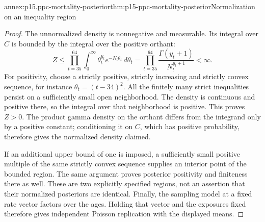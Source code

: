 \begin{annexitem}{annex:p15.ppc-mortality-posterior}{thm:p15-ppc-mortality-posterior}{Normalization on an inequality region}
\begin{proof}
The unnormalized density is nonnegative and measurable. Its integral over
\(C\) is bounded by the integral over the positive orthant:
\[
 Z\leq\prod_{t=35}^{64}\int_0^\infty
               \theta_t^{y_t}e^{-N_t\theta_t}\,d\theta_t
   =\prod_{t=35}^{64}\frac{\Gamma(y_t+1)}{N_t^{y_t+1}}<\infty.
\]
For positivity, choose a strictly positive, strictly increasing and strictly
convex sequence, for instance \(\theta_t=(t-34)^2\). All the finitely
many strict inequalities persist on a sufficiently small open neighborhood.
The density is continuous and positive there, so the integral over that
neighborhood is positive. This proves \(Z>0\). The product gamma
density on the orthant differs from the integrand only by a positive
constant; conditioning it on \(C\), which has positive probability,
therefore gives the normalized density claimed.

If an additional upper bound of one is imposed, a sufficiently small
positive multiple of the same strictly convex sequence supplies an interior
point of the bounded region. The same argument proves posterior positivity
and finiteness there as well. These are two explicitly specified regions,
not an assertion that their normalized posteriors are identical.
Finally, the sampling model at a fixed rate vector factors over the ages.
Holding that vector and the exposures fixed therefore gives independent
Poisson replication with the displayed means.
\end{proof}
\end{annexitem}

